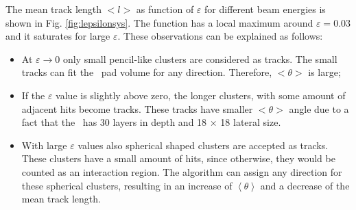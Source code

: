 \begin{appendices}
	The mean track length $<l>$ as function of $\varepsilon$ for different beam energies is shown in Fig. \ref{fig:lepsilonsys}. 
	The function has a local maximum around $\varepsilon=0.03$ and it saturates for large $\varepsilon$. 
	These observations can be explained as follows:
	\begin{itemize}
		\item At $\varepsilon \to 0$ only small pencil-like clusters are considered as tracks. The small tracks can fit the \ecal\ pad volume for any direction. Therefore, $<\theta>$ is large; 
		\item If the $\varepsilon$ value is slightly above zero, the longer clusters, with some amount of adjacent hits become tracks. These tracks have smaller $<\theta>$ angle due to a fact that the \ecalp\ has 30 layers in depth and 18 $\times$ 18 lateral size.  
		\item With large $\varepsilon$ values also spherical shaped clusters are accepted as tracks. These clusters have a small amount of hits, since otherwise, they would be counted as an interaction region. The algorithm can assign any direction for these spherical clusters, resulting in an increase of $\left<\theta\right>$ and a decrease of the mean track length. 
	\end{itemize}
	
	
	

\end{appendices}
